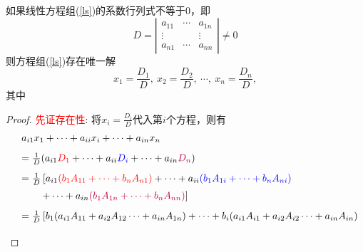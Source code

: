 \documentclass[10pt,a4paper%
tablecaptionabove]{article}
\newcommand{\blue}{\textcolor{blue}}
\newcommand{\red}{\textcolor{red}}
\newcommand{\purple}{\textcolor{purple}}
\newcommand{\cd}{\cdots}
\newcommand{\vd}{\vdots}
\begin{document}
\begin{CJK}{UTF8}{gkai}
  \begin{dingli}[克莱姆法则]
      如果线性方程组(\ref{ls})的系数行列式不等于0，即
      $$
      D = \left|
      \begin{array}{ccc}
        a_{11}  & \cd  & a_{1n} \\
        \vd    &      & \vd  \\
        a_{n1}  & \cd  & a_{nn}
      \end{array}
      \right|\ne 0
      $$
      则方程组(\ref{ls})存在唯一解
      $$
      x_1 = \frac{D_1}D, \ x_2 = \frac{D_2} D, \ \cdots, \ x_n = \frac{D_n}D,
      $$
      其中
      \begin{center}
      \end{center}
    \end{dingli}
    \begin{proof}
    \red{先证存在性}: 
    将$x_i=\frac{D_i}D$代入第$i$个方程，则有
    $$
    \begin{array}{cl}
      & a_{i1}x_1 +\cd + a_{ii}x_i + \cd + a_{in}x_n \\[0.3cm]
      & =   \frac1D(a_{i1}\red{D_1} +\cd + a_{ii}\blue{D_i} + \cd + a_{in}\purple{D_n}) \\[0.3cm]
      & =   \frac1D \left[
        a_{i1}\red{(b_1 A_{11}+ \cd + b_nA_{n1})}
        +\cd+ a_{ii}\blue{(b_1 A_{1i} + \cd + b_nA_{ni})}  \right. \\[0.2cm]
      &  \left. \ \ \ \ \ \
        + \cd + a_{in}\purple{(b_1 A_{1n}+ \cd + b_nA_{nn})} \right]\\[0.3cm]
      & =   \frac1D \left[
        b_1(a_{i1} A_{11}+ a_{i2} A_{12}  \cd + a_{in}A_{1n}) 
        +\cd + b_i(a_{i1} A_{i1}+ a_{i2} A_{i2}  \cd + a_{in}A_{in})   \right. \\[0.2cm]

\end{array}$$
\end{proof}
\end{CJK}
\end{document}
